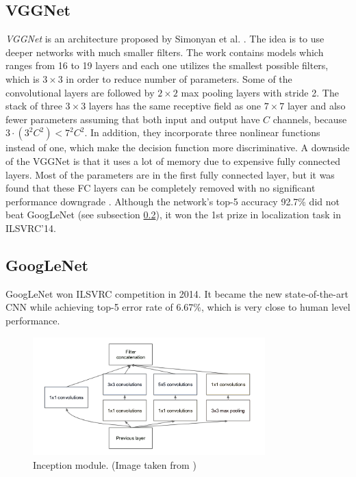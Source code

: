 \subsection{VGGNet}
\label{sec:cnn_rw:vggnet}

\textit{VGGNet} is an architecture proposed by Simonyan et al. \cite{bib:simonyan2014very}.
The idea is to use deeper networks with much smaller filters. The work contains models
which ranges from 16 to 19 layers and each one utilizes the smallest possible filters,
which is $3\times3$ in order to reduce number of parameters.
Some of the convolutional layers are followed by $2\times2$ max pooling layers with stride
2.
The stack of three $3\times3$ layers
has the same receptive field as one $7\times7$ layer and also fewer parameters
assuming that both input and output have $C$ channels, because
$3\cdot(3^2C^2) < 7^2C^2$. In addition, they incorporate three nonlinear functions
instead of one, which make the decision function more discriminative.
A downside of the VGGNet is that it uses a lot of memory due to expensive fully connected
layers. Most of the parameters are in the first fully connected layer, but it was found
that these FC layers can be completely removed with no significant performance downgrade
\cite{bib:szegedy2015going}.
Although the network's top-5 accuracy 92.7\% did not beat GoogLeNet (see subsection
\ref{sec:cnn_rw:googlenet}), it won the 1st prize in localization task in ILSVRC'14.

\subsection{GoogLeNet}
\label{sec:cnn_rw:googlenet}

GoogLeNet \cite{bib:szegedy2015going} won ILSVRC competition in 2014. It became the new
state-of-the-art CNN while achieving top-5 error rate of 6.67\%, which
is very close to human level performance.

\begin{figure}[h]
	\centerline{\includegraphics[width=0.8\textwidth]{images/googlenet_inception.png}}
	\caption[Inception module]{Inception module. (Image taken from \cite{bib:szegedy2015going})}
	\label{img:inception_module}
\end{figure}

